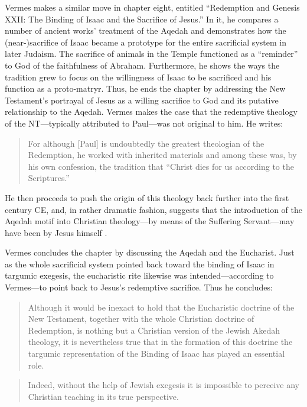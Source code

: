 Vermes makes a similar move in chapter eight, entitled ``Redemption and
Genesis XXII: The Binding of Isaac and the Sacrifice of Jesus.'' In it,
he compares a number of ancient works' treatment of the Aqedah and
demonstrates how the (near-)sacrifice of Isaac became a prototype for
the entire sacrificial system in later Judaism. The sacrifice of animals
in the Temple functioned as a ``reminder'' to God of the faithfulness of
Abraham. Furthermore, he shows the ways the tradition grew to focus on
the willingness of Isaac to be sacrificed and his function as a
proto-matryr. Thus, he ends the chapter by addressing the New
Testament's portrayal of Jesus as a willing sacrifice to God and its
putative relationship to the Aqedah. Vermes makes the case that the
redemptive theology of the NT---typically attributed to Paul---was not
original to him. He writes:

\begin{quote}
For although {[}Paul{]} is undoubtedly the greatest theologian of the
Redemption, he worked with inherited materials and among these was, by
his own confession, the tradition that ``Christ dies for us according to
the Scriptures.''\autocite[221]{vermes1961}
\end{quote}

He then proceeds to push the origin of this theology back further into
the first century CE, and, in rather dramatic fashion, suggests that the
introduction of the Aqedah motif into Christian theology---by means of
the Suffering Servant---may have been by Jesus himself
\autocite[223]{vermes1961}.

Vermes concludes the chapter by discussing the Aqedah and the Eucharist.
Just as the whole sacrificial system pointed back toward the binding of
Isaac in targumic exegesis, the eucharistic rite likewise was
intended---according to Vermes---to point back to Jesus's redemptive
sacrifice. Thus he concludes:

\begin{quote}
Although it would be inexact to hold that the Eucharistic doctrine of
the New Testament, together with the whole Christian doctrine of
Redemption, is nothing but a Christian version of the Jewish Akedah
theology, it is nevertheless true that in the formation of this doctrine
the targumic representation of the Binding of Isaac has played an
essential role.
\end{quote}

\begin{quote}
Indeed, without the help of Jewish exegesis it is impossible to perceive
any Christian teaching in its true
perspective.\autocite[227]{vermes1961}
\end{quote}

